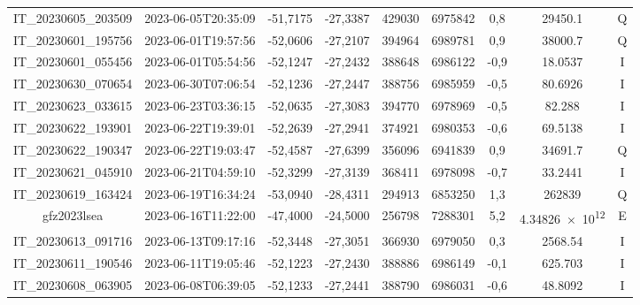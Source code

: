 \begin{center}
\begin{longtable}{ccccS[table-format=6.0]S[table-format=7.0]ccc}
IT\_20230605\_203509 & 2023-06-05T20:35:09 & -51,7175 & -27,3387 & 429030 & 6975842 & 0,8 & \num[round-precision=3,round-mode=figures,scientific-notation=true]{29450.1} & Q \\
IT\_20230601\_195756 & 2023-06-01T19:57:56 & -52,0606 & -27,2107 & 394964 & 6989781 & 0,9 & \num[round-precision=3,round-mode=figures,scientific-notation=true]{38000.7} & Q \\
IT\_20230601\_055456 & 2023-06-01T05:54:56 & -52,1247 & -27,2432 & 388648 & 6986122 & -0,9 & \num[round-precision=3,round-mode=figures,scientific-notation=true]{18.0537} & I \\
IT\_20230630\_070654 & 2023-06-30T07:06:54 & -52,1236 & -27,2447 & 388756 & 6985959 & -0,5 & \num[round-precision=3,round-mode=figures,scientific-notation=true]{80.6926} & I \\
IT\_20230623\_033615 & 2023-06-23T03:36:15 & -52,0635 & -27,3083 & 394770 & 6978969 & -0,5 & \num[round-precision=3,round-mode=figures,scientific-notation=true]{82.288} & I \\
IT\_20230622\_193901 & 2023-06-22T19:39:01 & -52,2639 & -27,2941 & 374921 & 6980353 & -0,6 & \num[round-precision=3,round-mode=figures,scientific-notation=true]{69.5138} & I \\
IT\_20230622\_190347 & 2023-06-22T19:03:47 & -52,4587 & -27,6399 & 356096 & 6941839 & 0,9 & \num[round-precision=3,round-mode=figures,scientific-notation=true]{34691.7} & Q \\
IT\_20230621\_045910 & 2023-06-21T04:59:10 & -52,3299 & -27,3139 & 368411 & 6978098 & -0,7 & \num[round-precision=3,round-mode=figures,scientific-notation=true]{33.2441} & I \\
IT\_20230619\_163424 & 2023-06-19T16:34:24 & -53,0940 & -28,4311 & 294913 & 6853250 & 1,3 & \num[round-precision=3,round-mode=figures,scientific-notation=true]{262839} & Q \\
gfz2023lsea & 2023-06-16T11:22:00 & -47,4000 & -24,5000 & 256798 & 7288301 & 5,2 & \num[round-precision=3,round-mode=figures,scientific-notation=true]{4.34826e+12} & E \\
IT\_20230613\_091716 & 2023-06-13T09:17:16 & -52,3448 & -27,3051 & 366930 & 6979050 & 0,3 & \num[round-precision=3,round-mode=figures,scientific-notation=true]{2568.54} & I \\
IT\_20230611\_190546 & 2023-06-11T19:05:46 & -52,1223 & -27,2430 & 388886 & 6986149 & -0,1 & \num[round-precision=3,round-mode=figures,scientific-notation=true]{625.703} & I \\
IT\_20230608\_063905 & 2023-06-08T06:39:05 & -52,1233 & -27,2441 & 388790 & 6986031 & -0,6 & \num[round-precision=3,round-mode=figures,scientific-notation=true]{48.8092} & I \\

\end{longtable}
\end{center}
